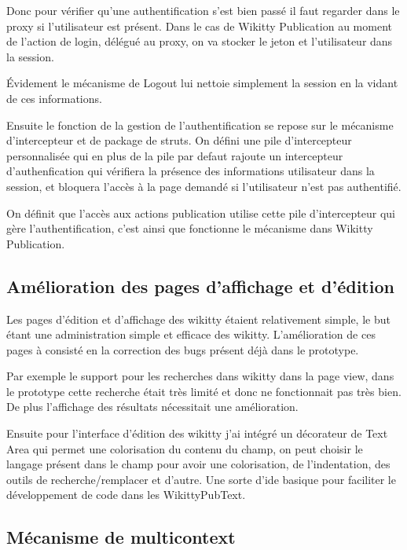 Donc pour vérifier qu'une authentification s'est bien passé il faut regarder
dans le proxy si l'utilisateur est présent. Dans le cas de Wikitty Publication
au moment de l'action de login, délégué au proxy, on va stocker le jeton et
l'utilisateur dans la session.

Évidement le mécanisme de Logout lui nettoie simplement la session en la vidant
de ces informations.

Ensuite le fonction de la gestion de l'authentification se repose sur le
mécanisme d'intercepteur et de package de struts. On défini une pile
d'intercepteur personnalisée qui en plus de la pile par defaut rajoute un
intercepteur d'authenfication qui vérifiera la présence des informations
utilisateur dans la session, et bloquera l'accès à la page demandé si
l'utilisateur n'est pas authentifié.

On définit que l'accès aux actions publication utilise cette pile d'intercepteur
qui gère l'authentification, c'est ainsi que fonctionne le mécanisme dans
Wikitty Publication.

\subsection{Amélioration des pages d'affichage et d'édition}

Les pages d'édition et d'affichage des wikitty étaient relativement simple, le
but étant une administration simple et efficace des wikitty. L'amélioration de
ces pages à consisté en la correction des bugs présent déjà dans le prototype.

Par exemple le support pour les recherches dans wikitty dans la page view,
dans le prototype cette recherche était très limité et donc ne fonctionnait pas
très bien. De plus l'affichage des résultats nécessitait une amélioration.

Ensuite pour l'interface d'édition des wikitty j'ai intégré un décorateur de
Text Area qui permet une colorisation du contenu du champ, on peut choisir le
langage présent dans le champ pour avoir une colorisation, de l'indentation, des
outils de recherche/remplacer et d'autre. Une sorte d'ide basique pour
faciliter le développement de code dans les WikittyPubText.



\subsection{Mécanisme de multicontext}

